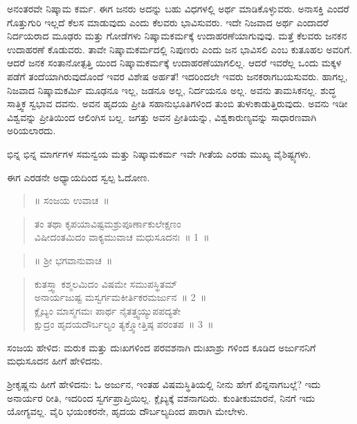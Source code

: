 ಅನಂತರವೇ ನಿಷ್ಕಾಮ ಕರ್ಮ. ಈಗ ಜನರು ಅದನ್ನು ಬಹು ವಿಧಗಳಲ್ಲಿ ಅರ್ಥ ಮಾಡಿಕೊಳ್ಳುವರು. ಅನಾಸಕ್ತಿ ಎಂದರೆ ಗೊತ್ತುಗುರಿ ಇಲ್ಲದೆ ಕೆಲಸ ಮಾಡುವುದು ಎಂದು ಕೆಲವರು ಭಾವಿಸುವರು. ಇದೇ ನಿಜವಾದ ಅರ್ಥ ಎಂದಾದರೆ ನಿರ್ದಯರಾದ ಮೂಢರು ಮತ್ತು ಗೋಡೆಗಳು ನಿಷ್ಕಾಮಕರ್ಮಕ್ಕೆ ಉದಾಹರಣೆಯಾಗುವುವು. ಮತ್ತೆ ಕೆಲವರು ಜನಕನ ಉದಾಹರಣೆ ಕೊಡುವರು. ತಾವೇ ನಿಷ್ಕಾಮಕರ್ಮದಲ್ಲಿ ನಿಪುಣರು ಎಂದು ಜನ ಭಾವಿಸಲಿ ಎಂಬ ಕುತೂಹಲ ಅವರಿಗೆ. ಆದರೆ ಜನಕ ಸಂತಾನೋತ್ಪತ್ತಿ ಯಿಂದ ನಿಷ್ಕಾಮಕರ್ಮಕ್ಕೆ ಉದಾಹರಣೆಯಾಗಲಿಲ್ಲ. ಆದರೆ ಇವರೆಲ್ಲ ಒಂದು ಮಕ್ಕಳ ಪಡೆಗೆ ತಂದೆಯಾಗಿರುವುದೊಂದೆ ಇವರ ವಿಶೇಷ ಅರ್ಹತೆ! ಇದರಿಂದಲೇ ಇವರು ಜನಕರಾಗಬಯಸುವರು. ಹಾಗಲ್ಲ, ನಿಜವಾದ ನಿಷ್ಕಾಮಕರ್ಮಿ ಮೂಢನೂ ಇಲ್ಲ, ಜಡನೂ ಅಲ್ಲ, ನಿರ್ದಯನೂ ಅಲ್ಲ. ಅವನು ತಾಮಸಿಕನಲ್ಲ. ಶುದ್ಧ ಸಾತ್ತ್ವಿಕ ಸ್ವಭಾವ ದವನು. ಅವನ ಹೃದಯ ಪ್ರೀತಿ ಸಹಾನುಭೂತಿಗಳಿಂದ ತುಂಬಿ ತುಳುಕಾಡುತ್ತಿರುವುದು. ಅವನು ಇಡೀ ವಿಶ್ವವನ್ನು ಪ್ರೀತಿಯಿಂದ ಆಲಿಂಗಿಸ ಬಲ್ಲ. ಜಗತ್ತು ಅವನ ಪ್ರೀತಿಯನ್ನು, ವಿಶ್ವಕಾರುಣ್ಯವನ್ನು ಸಾಧಾರಣವಾಗಿ ಅರಿಯಲಾರದು.

ಭಿನ್ನ ಭಿನ್ನ ಮಾರ್ಗಗಳ ಸಮನ್ವಯ ಮತ್ತು ನಿಷ್ಕಾಮಕರ್ಮ ಇವೇ ಗೀತೆಯ ಎರಡು ಮುಖ್ಯ ವೈಶಿಷ್ಟ್ಯಗಳು.

ಈಗ ಎರಡನೇ ಅಧ್ಯಾಯದಿಂದ ಸ್ವಲ್ಪ ಓದೋಣ.

\begin{verse}
॥ ಸಂಜಯ ಉವಾಚ~॥
\end{verse}

\begin{verse}
ತಂ ತಥಾ ಕೃಪಯಾವಿಷ್ಟಮಶ್ರುಪೂರ್ಣಾಕುಲೇಕ್ಷಣಂ\\ವಿಷೀದಂತಮಿದಂ ವಾಕ್ಯಮುವಾಚ ಮಧುಸೂದನಃ~॥ 1~॥
\end{verse}

\begin{verse}
॥ ಶ‍್ರೀ ಭಗವಾನುವಾಚ~॥
\end{verse}

\begin{verse}
ಕುತಸ್ತ್ವಾ ಕಶ್ಮಲಮಿದಂ ವಿಷಮೇ ಸಮುಪಸ್ಥಿತಮ್​\\ಅನಾರ್ಯಜುಷ್ಟ ಮಸ್ವರ್ಗಮಕೀರ್ತಿಕರಮರ್ಜುನ~॥ 2~॥\\ಕ್ಲೈಬ್ಯಂ ಮಾಸ್ಮಗಮಃ ಪಾರ್ಥ ನೈತತ್ತ್ವಯ್ಯುಪಪದ್ಯತೇ\\ಕ್ಷುದ್ರಂ ಹೃದಯದೌರ್ಬಲ್ಯಂ ತ್ಯಕ್ತ್ವೋತ್ತಿಷ್ಠ ಪರಂತಪ~॥ 3~॥
\end{verse}

ಸಂಜಯ ಹೇಳಿದ: ಮರುಕ ಮತ್ತು ದುಃಖಗಳಿಂದ ಪರವಶನಾಗಿ ದುಃಖಾಶ್ರು ಗಳಿಂದ ಕೂಡಿದ ಅರ್ಜುನನಿಗೆ ಮಧುಸೂದನ ಹೀಗೆ ಹೇಳಿದನು.

ಶ‍್ರೀಕೃಷ್ಣನು ಹೀಗೆ ಹೇಳಿದನು: ಓ ಅರ್ಜುನ, ಇಂತಹ ವಿಷಮಸ್ಥಿತಿಯಲ್ಲಿ ನೀನು ಹೇಗೆ ಖಿನ್ನನಾಗಬಲ್ಲೆ? ಇದು ಅನಾರ್ಯರ ರೀತಿ, ಇದರಿಂದ ಸ್ವರ್ಗಪ್ರಾಪ್ತಿಯಿಲ್ಲ. ಕ್ಲೈಬ್ಯಕ್ಕೆ ವಶನಾಗದಿರು. ಕುಂತೀಕುಮಾರನೆ, ನಿನಗೆ ಇದು ಯೋಗ್ಯವಲ್ಲ. ವೈರಿ ಭಯಂಕರನೇ, ಹೃದಯ ದೌರ್ಬಲ್ಯದಿಂದ ಪಾರಾಗಿ ಮೇಲೇಳು.

